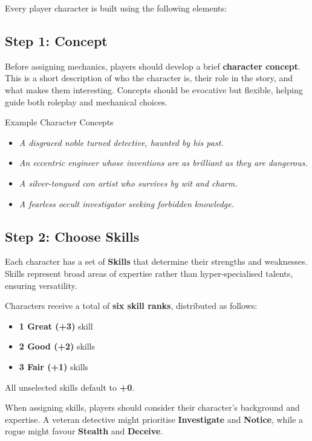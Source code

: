 Every player character is built using the following elements:

\subsection{Step 1: Concept}

Before assigning mechanics, players should develop a brief \textbf{character concept}. This is a short description of who the character is, their role in the story, and what makes them interesting. Concepts should be evocative but flexible, helping guide both roleplay and mechanical choices.

\begin{DndSidebar}[float=!t]{Example Character Concepts}
    \begin{itemize}
        \item \emph{A disgraced noble turned detective, haunted by his past.}
        \item \emph{An eccentric engineer whose inventions are as brilliant as they are dangerous.}
        \item \emph{A silver-tongued con artist who survives by wit and charm.}
        \item \emph{A fearless occult investigator seeking forbidden knowledge.}
    \end{itemize}
\end{DndSidebar}

\subsection{Step 2: Choose Skills}

Each character has a set of \textbf{Skills} that determine their strengths and weaknesses. Skills represent broad areas of expertise rather than hyper-specialised talents, ensuring versatility.

Characters receive a total of \textbf{six skill ranks}, distributed as follows:

\begin{itemize}
    \item \textbf{1 Great (+3)} skill
    \item \textbf{2 Good (+2)} skills
    \item \textbf{3 Fair (+1)} skills
\end{itemize}

All unselected skills default to \textbf{+0}.

\begin{DndReadAloud}{}
When assigning skills, players should consider their character’s background and expertise. A veteran detective might prioritise \textbf{Investigate} and \textbf{Notice}, while a rogue might favour \textbf{Stealth} and \textbf{Deceive}.
\end{DndReadAloud}

